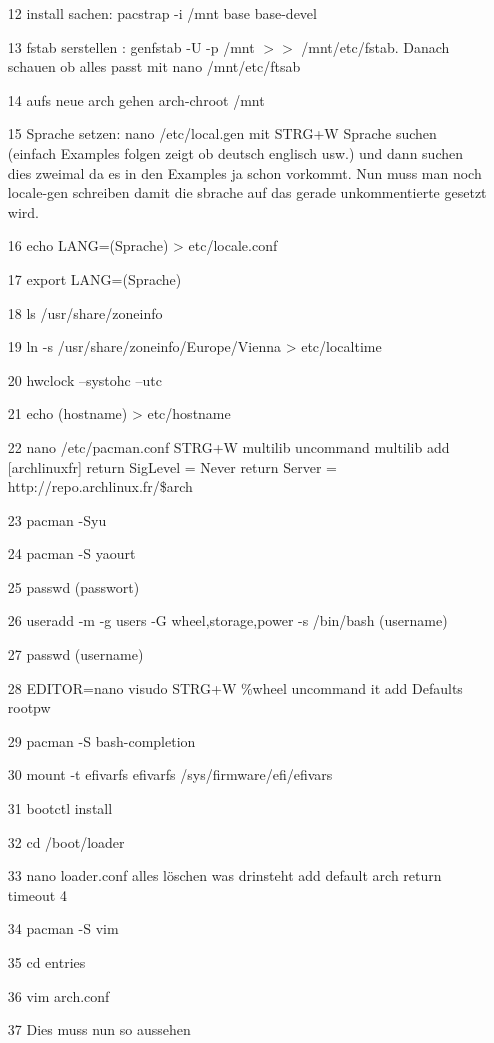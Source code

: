 \documentclass[a4paper,12pt]{article}
\begin{document}
\begin{itemize}
	\item[12] install sachen: pacstrap -i /mnt base base-devel
	\item[13] fstab serstellen : genfstab -U -p /mnt $>>$ /mnt/etc/fstab. Danach schauen ob alles passt mit nano /mnt/etc/ftsab
	\item[14] aufs neue arch gehen arch-chroot /mnt
	\item[15] Sprache setzen: nano /etc/local.gen mit STRG+W Sprache suchen (einfach Examples folgen zeigt ob deutsch englisch usw.) und dann suchen dies zweimal da es in den Examples ja schon vorkommt. Nun muss man noch locale-gen schreiben damit die sbrache auf das gerade unkommentierte gesetzt wird.
	\item[16] echo LANG=(Sprache) > etc/locale.conf
	\item[17] export LANG=(Sprache) 
	\item[18] ls /usr/share/zoneinfo
	\item[19] ln -s /usr/share/zoneinfo/Europe/Vienna > etc/localtime
	\item[20] hwclock --systohc --utc
	\item[21] echo (hostname) > etc/hostname
	\item[22] nano /etc/pacman.conf        STRG+W multilib      uncommand multilib       add [archlinuxfr] return SigLevel = Never return Server = http://repo.archlinux.fr/\$arch
	\item[23] pacman -Syu
	\item[24] pacman -S yaourt
	\item[25] passwd (passwort)
	\item[26] useradd -m -g users -G wheel,storage,power -s /bin/bash (username)
	\item[27] passwd	(username)
	\item[28] EDITOR=nano visudo       STRG+W \%wheel     uncommand it       add       Defaults rootpw
	\item[29] pacman -S bash-completion
	\item[30] mount -t efivarfs efivarfs /sys/firmware/efi/efivars
	\item[31] bootctl install
	\item[32] cd /boot/loader
	\item[33] nano loader.conf       alles löschen was drinsteht       add   default arch return timeout 4
	\item[34] pacman -S vim
	\item[35] cd entries
	\item[36] vim arch.conf
	\item[37] Dies muss nun so aussehen

\end{itemize}
\end{document}
